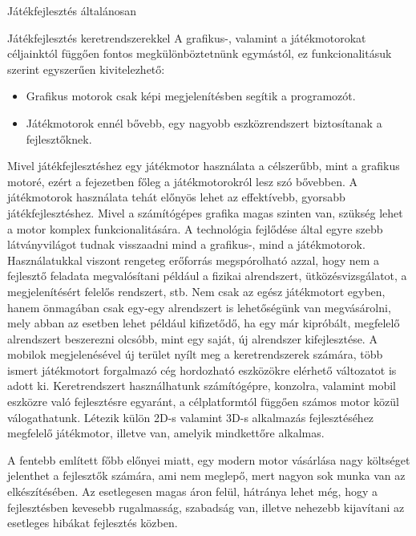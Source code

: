 \begin{MyChapter}{Játékfejlesztés általánosan}
\begin{MySection}{Játékfejlesztés keretrendszerekkel}
		A grafikus-, valamint a játékmotorokat céljainktól függően fontos megkülönböztetnünk egymástól, ez funkcionalitásuk szerint egyszerűen kivitelezhető:
		\begin{itemize}
			\item Grafikus motorok csak képi megjelenítésben segítik a programozót.
			\item Játékmotorok ennél bővebb, egy nagyobb eszközrendszert biztosítanak a fejlesztőknek.
		\end{itemize}
		Mivel játékfejlesztéshez egy játékmotor használata a célszerűbb, mint a grafikus motoré, ezért a fejezetben főleg a játékmotorokról lesz szó bővebben.
		A játékmotorok használata tehát előnyös lehet az effektívebb, gyorsabb játékfejlesztéshez. Mivel a számítógépes grafika magas szinten van, szükség lehet a motor komplex funkcionalitására. A technológia fejlődése által egyre szebb látványvilágot tudnak visszaadni mind a grafikus-, mind a játékmotorok. Használatukkal viszont rengeteg erőforrás megspórolható azzal, hogy nem a fejlesztő feladata megvalósítani például a fizikai alrendszert, ütközésvizsgálatot, a megjelenítésért felelős rendszert, stb.
		Nem csak az egész játékmotort egyben, hanem önmagában csak egy-egy alrendszert is lehetőségünk van megvásárolni, mely abban az esetben lehet például kifizetődő, ha egy már kipróbált, megfelelő alrendszert beszerezni olcsóbb, mint egy saját, új alrendszer kifejlesztése. \cite{mileff}
		A mobilok megjelenésével új terület nyílt meg a keretrendszerek számára, több ismert játékmotort forgalmazó cég hordozható eszközökre elérhető változatot is adott ki.
		Keretrendszert használhatunk számítógépre, konzolra, valamint mobil eszközre való fejlesztésre egyaránt, a célplatformtól függően számos motor közül válogathatunk. Létezik külön 2D-s valamint 3D-s alkalmazás fejlesztéséhez megfelelő játékmotor, illetve van, amelyik mindkettőre alkalmas.
		
		A fentebb említett főbb előnyei miatt, egy modern motor vásárlása nagy költséget jelenthet a fejlesztők számára, ami nem meglepő, mert nagyon sok munka van az elkészítésében.
		Az esetlegesen magas áron felül, hátránya lehet még, hogy a fejlesztésben kevesebb rugalmasság, szabadság van, illetve nehezebb kijavítani az esetleges hibákat fejlesztés közben.
		

\end{MySection}
\end{MyChapter}
